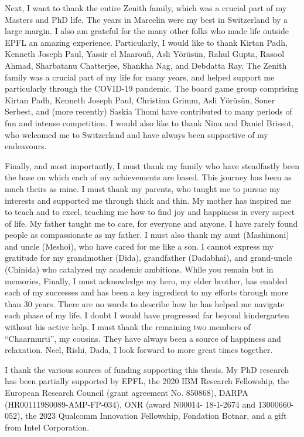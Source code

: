 Next, I want to thank the entire Zenith family, which was a crucial part of my
Masters and PhD life. 
The years in Marcelin were my best in Switzerland by a large margin.
I also am grateful for the many other folks who made life outside EPFL an amazing
experience.
Particularly, I would like to thank Kirtan Padh, Kenneth Joseph Paul, 
Yassir el Maaroufi, Asli Yörüsün, Rahul Gupta, Rasool Ahmad, Sharbatanu Chatterjee, 
Shankha Nag, and Debdatta Ray.
The Zenith family was a crucial part of my life for many years, and helped support
me particularly through the COVID-19 pandemic.
The board game group comprising Kirtan Padh, Kenneth Joseph Paul, Christina Grimm,
Asli Yörüsün, Soner Serbest, and (more recently) Saskia Thomi have contributed to 
many periods of fun and intense competition. 
I would also like to thank Nina and Daniel Brissot, who welcomed me to Switzerland
and have always been supportive of my endeavours.

Finally, and most importantly, I must thank my family who have steadfastly been
the base on which each of my achievements are based.
This journey has been as much theirs as mine.
I must thank my parents, who taught me to pursue my interests and supported me through
thick and thin. 
My mother has inspired me to teach and to excel, teaching me how to find joy and 
happiness in every aspect of life. 
My father taught me to care, for everyone and anyone. 
I have rarely found people as compassionate as my father. 
I must also thank my aunt (Mashimoni) and uncle (Meshoi), 
who have cared for me like a son.
I cannot express my gratitude for my grandmother (Dida), grandfather (Dadabhai),
and grand-uncle (Chinida) who catalyzed my academic ambitions.
While you remain but in memories, 
Finally, I must acknowledge my hero, my elder brother, has enabled each of my 
successes and has been a key ingredient to my efforts through more than 30 years.
There are no words to describe how he has helped me navigate each phase of my life. 
I doubt I would have progressed far beyond kindergarten without his active help.
I must thank the remaining two members of ``Chaarmurti'', my cousins.
They have always been a source of happiness and relaxation. 
Neel, Rishi, Dada, I look forward to more great times together. 

I thank the various sources of funding supporting this thesis. 
My PhD research has been partially supported by 
EPFL, 
the 2020 IBM Research Fellowship, 
the European Research Council (grant agreement No. 850868),
DARPA (HR001119S0089-AMP-FP-034),  
ONR (award N00014- 18-1-2674 and 13000660-052),
the 2023 Qualcomm Innovation Fellowship,
Fondation Botnar, and 
a gift from Intel Corporation.

